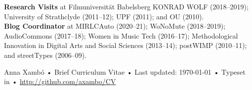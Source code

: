 \documentclass[10pt, a4paper]{article}
\begin{document}
{\textbf{Research Visits}} at Filmuniversität Babelsberg KONRAD WOLF (2018--2019); University of Strathclyde (2011--12); UPF (2011); and OU (2010).\\

{\textbf{Blog Coordinator}} at MIRLCAuto (2020--21); WoNoMute (2018--2019); AudioCommons (2017--18); Women in Music Tech (2016--17); Methodological Innovation in Digital Arts and Social Sciences (2013--14); postWIMP (2010--11); and streetTypes (2006--09).


\begin{center}
{\scriptsize  Anna Xambó •\- Brief Curriculum Vitae •\- Last updated: \today\- •\- %
Typeset in \href{http://nitens.org/taraborelli/cvtex}{
\XeTeX } %
•\- 
\href{http://github.com/axambo/CV}{http://github.com/axambo/CV}}
\end{center}
\end{document}
